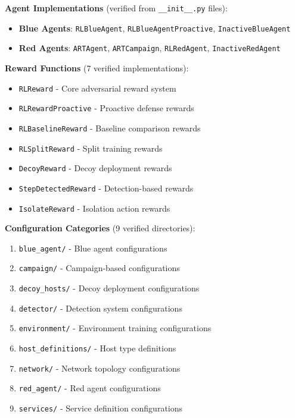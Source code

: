 \documentclass[12pt,a4paper]{article}
\begin{document}
\textbf{Agent Implementations} (verified from \texttt{\_\_init\_\_.py} files):
\begin{itemize}
    \item \textbf{Blue Agents}: \texttt{RLBlueAgent}, \texttt{RLBlueAgentProactive}, \texttt{InactiveBlueAgent}
    \item \textbf{Red Agents}: \texttt{ARTAgent}, \texttt{ARTCampaign}, \texttt{RLRedAgent}, \texttt{InactiveRedAgent}
\end{itemize}

\textbf{Reward Functions} (7 verified implementations):
\begin{itemize}
    \item \texttt{RLReward} - Core adversarial reward system
    \item \texttt{RLRewardProactive} - Proactive defense rewards
    \item \texttt{RLBaselineReward} - Baseline comparison rewards
    \item \texttt{RLSplitReward} - Split training rewards
    \item \texttt{DecoyReward} - Decoy deployment rewards
    \item \texttt{StepDetectedReward} - Detection-based rewards
    \item \texttt{IsolateReward} - Isolation action rewards
\end{itemize}

\textbf{Configuration Categories} (9 verified directories):
\begin{enumerate}
    \item \texttt{blue\_agent/} - Blue agent configurations
    \item \texttt{campaign/} - Campaign-based configurations
    \item \texttt{decoy\_hosts/} - Decoy deployment configurations
    \item \texttt{detector/} - Detection system configurations
    \item \texttt{environment/} - Environment training configurations
    \item \texttt{host\_definitions/} - Host type definitions
    \item \texttt{network/} - Network topology configurations
    \item \texttt{red\_agent/} - Red agent configurations
    \item \texttt{services/} - Service definition configurations
\end{enumerate}
\end{document}
